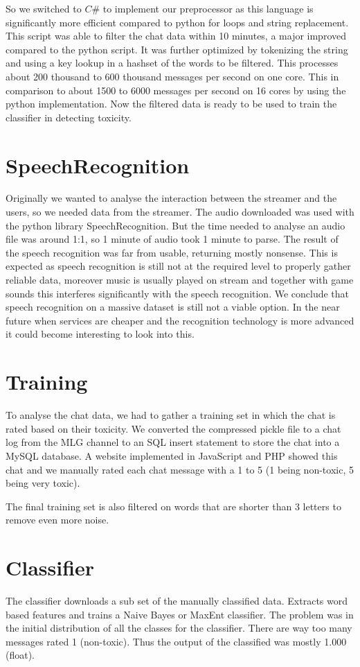 \documentclass[final]{report}
\begin{document}
So we switched to $C\#$ to implement our preprocessor as this language is significantly more efficient compared to python for loops and string replacement.
This script was able to filter the chat data within 10 minutes, a major improved compared to the python script.
It was further optimized by tokenizing the string and using a key lookup in a hashset of the words to be filtered.
This processes about 200 thousand to 600 thousand messages per second on one core.
This in comparison to about 1500 to 6000 messages per second on 16 cores by using the python implementation.
Now the filtered data is ready to be used to train the classifier in detecting toxicity.

\section{SpeechRecognition}
Originally we wanted to analyse the interaction between the streamer and the users, so we needed data from the streamer.
The audio downloaded was used with the python library SpeechRecognition. %
But the time needed to analyse an audio file was around 1:1, so 1 minute of audio took 1 minute to parse. The result of the speech recognition was far from usable, returning mostly nonsense.
This is expected as speech recognition is still not at the required level to properly gather reliable data, moreover music is usually played on stream and together with game sounds this interferes significantly with the speech recognition.
We conclude that speech recognition on a massive dataset is still not a viable option.
In the near future when services are cheaper and the recognition technology is more advanced it could become interesting to look into this.

\section{Training}
To analyse the chat data, we had to gather a training set in which the chat is rated based on their toxicity.
We converted the compressed pickle file to a chat log from the MLG channel to an SQL insert statement to store the chat into a MySQL database.
A website implemented in JavaScript and PHP showed this chat and we manually rated each chat message with a 1 to 5 (1 being non-toxic, 5 being very toxic).

The final training set is also filtered on words that are shorter than 3 letters to remove even more noise.

\section{Classifier}
The classifier downloads a sub set of the manually classified data.
Extracts word based features and trains a Naive Bayes or MaxEnt classifier.
The problem was in the initial distribution of all the classes for the classifier.
There are way too many messages rated 1 (non-toxic).
Thus the output of the classified was mostly 1.000 (float).
\end{document}
